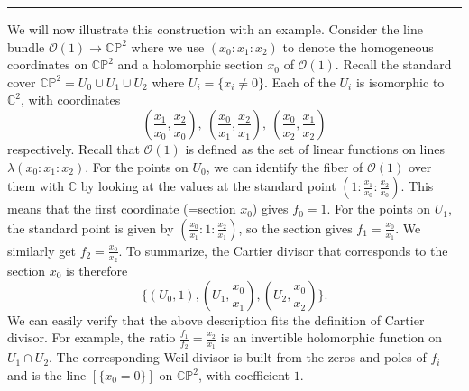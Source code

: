 \documentclass[11pt]{article}
\numberwithin{equation}{section}
\numberwithin{footnote}{section}
\newcommand{\blue}{\color{blue}}
\renewcommand{\P}{{\mathbb P}}
\newcommand{\C}{{\mathbb C}}
\begin{document}
\smallskip
{\blue \hrule}
We will now illustrate this construction with an example. Consider the line bundle $\mathcal O(1)\to \C\P^2$ where we use $(x_0:x_1:x_2)$ to denote the homogeneous coordinates on $\C\P^2$ and a holomorphic section $x_0$ of $\mathcal O(1)$. Recall the standard cover $\C\P^2 = U_0\cup U_1\cup U_2$ where  $U_i=\{x_i\neq 0\}$. Each of the $U_i$ is isomorphic to $\C^2$, with coordinates 
$$
(\frac {x_1}{x_0},\frac {x_2}{x_0}),~(\frac {x_0}{x_1},\frac {x_2}{x_1}),~(\frac {x_0}{x_2},\frac {x_1}{x_2})
$$
respectively. Recall that $\mathcal O(1)$ is defined as the set of linear functions on lines $\lambda (x_0:x_1:x_2)$. For the points on $U_0$, we can identify the fiber of  $\mathcal O(1)$ over them  with $\C$ by looking at the values at the standard point $(1:\frac {x_1}{x_0}:\frac {x_2}{x_0})$. This means that the first coordinate (=section $x_0$) gives $f_0=1$. For the points on $U_1$, the standard point is given by $(\frac {x_0}{x_1}:1:\frac {x_2}{x_1})$, so the section gives $f_1=\frac {x_0}{x_1}$. We similarly get $f_2=\frac {x_0}{x_2}$.
To summarize, the Cartier divisor that corresponds to the section $x_0$ is therefore
$$
\{(U_0,1),(U_1,\frac {x_0}{x_1}),(U_2,\frac {x_0}{x_2})\}.
$$
We can easily verify that the above description fits the definition of Cartier divisor. For example, the ratio $\frac {f_1}{f_2} = \frac {x_2}{x_1}$ is an invertible holomorphic function on $U_1\cap U_2$. The corresponding Weil divisor is built from the zeros and poles of $f_i$ and is the line $[\{x_0=0\}]$ on $\C\P^2$, with coefficient $1$.
\end{document}
